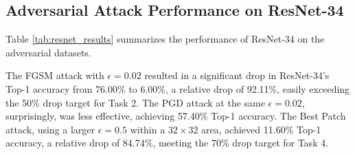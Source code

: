 \documentclass[letterpaper]{article}
\begin{document}
\subsection{Adversarial Attack Performance on ResNet-34}
Table \ref{tab:resnet_results} summarizes the performance of ResNet-34 on the adversarial datasets.
\begin{table}[h!]
\centering
\caption{ResNet-34 Accuracy on Adversarial Datasets (Crafted on ResNet-34)}
\label{tab:resnet_results}
\end{table}

The FGSM attack with $\epsilon=0.02$ resulted in a significant drop in ResNet-34's Top-1 accuracy from 76.00\% to 6.00\%, a relative drop of 92.11\%, easily exceeding the 50\% drop target for Task 2. The PGD attack at the same $\epsilon=0.02$, surprisingly, was less effective, achieving 57.40\% Top-1 accuracy. The Best Patch attack, using a larger $\epsilon=0.5$ within a $32 \times 32$ area, achieved 11.60\% Top-1 accuracy, a relative drop of 84.74\%, meeting the 70\% drop target for Task 4.
\end{document}
